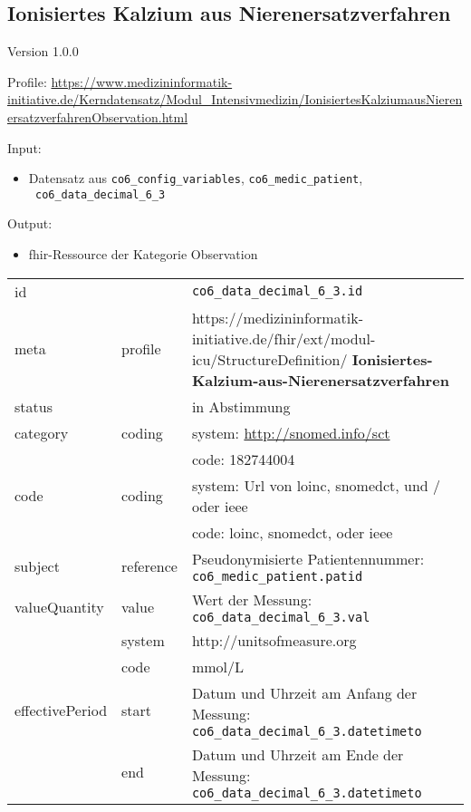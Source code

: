 \subsection{Ionisiertes Kalzium aus Nierenersatzverfahren} 
\noindent Version 1.0.0

\noindent Profile: \url{https://www.medizininformatik-initiative.de/Kerndatensatz/Modul_Intensivmedizin/IonisiertesKalziumausNierenersatzverfahrenObservation.html}

\noindent Input:
\begin{itemize}
	\item Datensatz aus \texttt{co6\_config\_variables}, \texttt{co6\_medic\_patient}, \\ \texttt{
co6\_data\_decimal\_6\_3}
\end{itemize}
Output:
\begin{itemize}
        \item \ac{fhir}-Ressource der Kategorie \glqq Observation\grqq{}
\end{itemize}
\begin{longtable}{|l|l|p{7.5cm}|}
        \hline
        \rowcolor{lightgray} \multicolumn{3}{|l|}{Data Mapping (inhaltlich)} \\ \hline
        id &  & \texttt{co6\_data\_decimal\_6\_3.id} \\ \hline
	meta & profile & https://medizininformatik-initiative.de/fhir/ext/modul-icu/StructureDefinition/\textbf{
Ionisiertes-Kalzium-aus-Nierenersatzverfahren} \\ \hline 
	status &  & in Abstimmung  \\ \hline 
	category & coding & system: \url{http://snomed.info/sct} \\
\cline{3-3}
	& & code: 182744004 \\ \hline
	code & coding & system: Url von \ac{loinc}, \ac{snomedct}, und / oder \ac{ieee} \\ 
	\cline{3-3} 
	 &  & code: \ac{loinc}, \ac{snomedct}, oder \ac{ieee} \\ \hline
	subject & reference & Pseudonymisierte Patientennummer: \texttt{co6\_medic\_patient.patid} \\ \hline
	valueQuantity & value & Wert der Messung: \texttt{
co6\_data\_decimal\_6\_3.val} \\
        \cline{2-3}
         & system & http://unitsofmeasure.org \\
         \cline{2-3}
         & code & mmol/L \\ \hline
    effectivePeriod & start & Datum und Uhrzeit am Anfang der Messung: \texttt{
co6\_data\_decimal\_6\_3.datetimeto} \\
    \cline{2-3}
     & end & Datum und Uhrzeit am Ende der Messung: \texttt{
co6\_data\_decimal\_6\_3.datetimeto} \\ \hline
\end{longtable}


